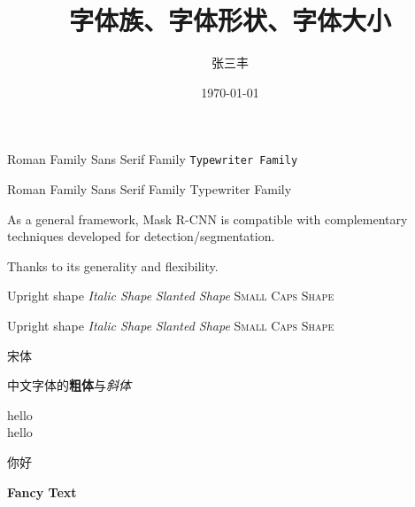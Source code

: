 \documentclass[12pt]{article}
\title{字体族、字体形状、字体大小}
\author{张三丰}
\date{\today}
\newcommand{\myfont}{\textbf{\textsf{Fancy Text}}}
\begin{document}
	\maketitle
	\textrm{Roman Family} \textsf{Sans Serif Family}  \texttt{Typewriter Family}%
	
	\rmfamily Roman Family {\sffamily Sans Serif Family} {\ttfamily Typewriter Family}%
	
	As a general framework, Mask R-CNN is compatible with complementary techniques developed for detection/segmentation.
	
	{\ttfamily Thanks to its generality and flexibility.}
	
	\textup{Upright shape} \textit{Italic Shape} \textsl{Slanted Shape} \textsc{Small Caps Shape}
	
	{\upshape Upright shape} {\itshape Italic Shape} {\slshape Slanted Shape} {\scshape Small Caps Shape}
	
	{\songti 宋体}   
	
	中文字体的\textbf{粗体}与\textit{斜体}
	
	{\tiny	hello} \\
	{\large	hello}
	
	 你好
	
	\myfont
	
\end{document}

